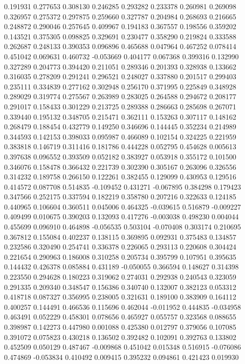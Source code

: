 0.191931
0.277653
0.308130
0.246285
0.293282
0.233378
0.260981
0.269098
0.326957
0.275372
0.297875
0.259660
0.327787
0.204984
0.268693
0.216665
0.248872
0.290046
0.257645
0.409967
0.194183
0.367557
0.198556
0.359202
0.143521
0.375305
0.098825
0.329691
0.230477
0.358290
0.219824
0.333588
0.262687
0.248133
0.390353
0.096896
0.465688
0.047964
0.467252
0.078414
0.451042
0.069631
0.460732
-0.053669
0.404177
0.067368
0.399316
0.132990
0.327289
0.204773
0.394420
0.211051
0.289346
0.201393
0.328938
0.133662
0.316035
0.278209
0.291241
0.296521
0.248027
0.337880
0.201517
0.299403
0.235111
0.334839
0.277162
0.302948
0.256170
0.371995
0.225849
0.348928
0.289029
0.319774
0.275567
0.263989
0.283025
0.264588
0.294672
0.208177
0.291017
0.158433
0.301229
0.213725
0.289388
0.286663
0.285698
0.267071
0.339440
0.195132
0.348705
0.215471
0.362111
0.153263
0.307117
0.148162
0.268479
0.188454
0.432779
0.149250
0.346696
0.144445
0.352234
0.214989
0.344593
0.142153
0.398033
0.095987
0.466089
0.102154
0.324225
0.221959
0.383818
0.146719
0.311416
0.181786
0.444228
0.052795
0.454628
0.005613
0.397638
0.096552
0.393509
0.052182
0.383927
0.053918
0.355172
0.101500
0.346076
0.158478
0.366432
0.221739
0.302390
0.305167
0.263096
0.326556
0.314232
0.189758
0.266150
0.122261
0.382455
0.129099
0.430953
0.129516
0.414572
0.087708
0.514835
-0.109452
0.431271
-0.067895
0.384298
0.179423
0.347566
0.252175
0.337594
0.182219
0.358780
0.207216
0.322633
0.124185
0.440965
0.106604
0.360511
0.045006
0.464325
-0.039615
0.516879
-0.009227
0.409499
0.010675
0.390203
0.132093
0.417276
-0.003038
0.498230
0.004044
0.455699
0.096910
0.464898
-0.056535
0.503104
-0.070408
0.303174
0.210695
0.367812
0.155084
0.402237
0.138115
0.369895
0.092931
0.375483
0.134857
0.232586
0.320490
0.254741
0.336378
0.226065
0.293113
0.220608
0.304424
0.221654
0.290963
0.186008
0.310258
0.205734
0.395799
0.107951
0.395635
0.144432
0.426378
0.085884
0.431189
-0.050055
0.366594
0.148627
0.314398
0.223550
0.294628
0.180223
0.319062
0.274031
0.292938
0.240543
0.323059
0.291335
0.209340
0.348547
0.156386
0.340740
0.132007
0.382123
0.053312
0.418718
0.087327
0.356995
0.238005
0.321631
0.189100
0.383909
0.164112
0.400257
0.144491
0.466536
0.115696
0.462044
-0.011952
0.444835
-0.034958
0.463491
0.052229
0.458301
0.078656
0.465927
0.055757
0.323568
0.088655
0.398987
0.142273
0.447980
0.001088
0.425380
0.012797
0.379056
0.107085
0.391072
0.075823
0.430218
0.136502
0.392482
0.102091
0.392763
0.133802
0.452509
0.050129
0.487467
-0.009868
0.451042
0.015348
0.516915
-0.076086
0.474869
-0.053834
0.410492
0.009415
0.395232
0.094861
0.421423
0.019930
